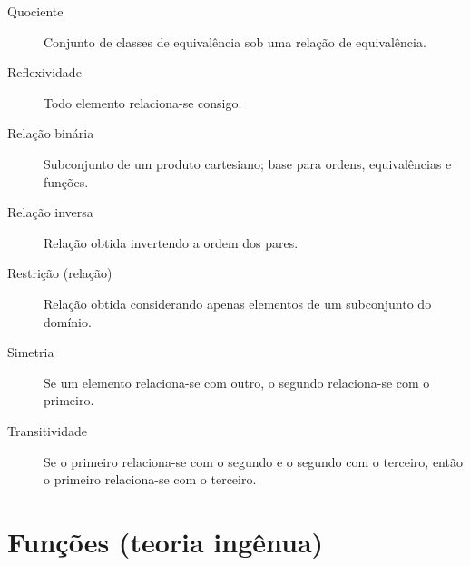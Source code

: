 \begin{description}
\item[Quociente] Conjunto de classes de equivalência sob uma relação de equivalência.
\item[Reflexividade] Todo elemento relaciona-se consigo.
\item[Relação binária] Subconjunto de um produto cartesiano; base para ordens, equivalências e funções.
\item[Relação inversa] Relação obtida invertendo a ordem dos pares.
\item[Restrição (relação)] Relação obtida considerando apenas elementos de um subconjunto do domínio.
\item[Simetria] Se um elemento relaciona-se com outro, o segundo relaciona-se com o primeiro.
\item[Transitividade] Se o primeiro relaciona-se com o segundo e o segundo com o terceiro, então o primeiro relaciona-se com o terceiro.
\end{description}

\section*{Funções (teoria ingênua)}

